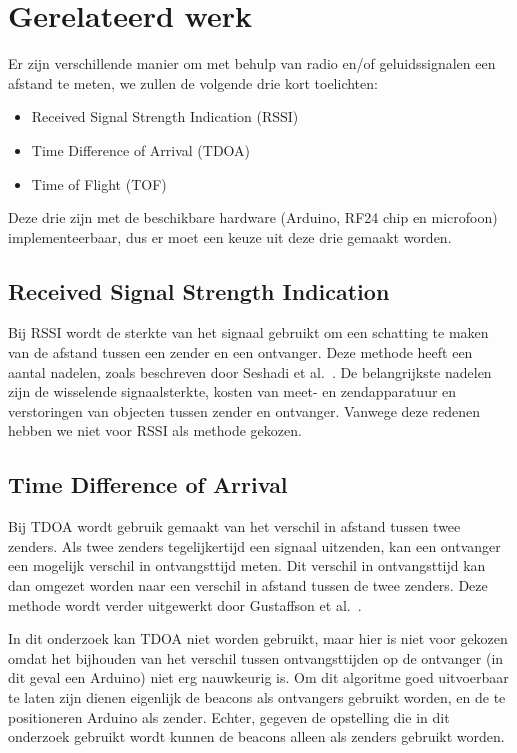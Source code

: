 \documentclass[a4paper,10pt]{article}
\begin{document}
\section{Gerelateerd werk}\label{sec:gerelateerd}
Er zijn verschillende manier om met behulp van radio en/of geluidssignalen een afstand te meten, we zullen de volgende drie kort toelichten:
\begin{itemize}
    \item Received Signal Strength Indication (RSSI)
    \item Time Difference of Arrival (TDOA)
    \item Time of Flight (TOF)
\end{itemize}
Deze drie zijn met de beschikbare hardware (Arduino, RF24 chip en microfoon) implementeerbaar, dus er moet een keuze uit deze drie gemaakt worden.

\subsection{Received Signal Strength Indication}
Bij RSSI wordt de sterkte van het signaal gebruikt om een schatting te maken van de afstand tussen een zender en een ontvanger. Deze methode heeft een aantal nadelen, zoals beschreven door Seshadi et al.~\cite{seshadri2005bayesian}. De belangrijkste nadelen zijn de wisselende signaalsterkte, kosten van meet- en zendapparatuur en verstoringen van objecten tussen zender en ontvanger. Vanwege deze redenen hebben we niet voor RSSI als methode gekozen.

\subsection{Time Difference of Arrival}
Bij TDOA wordt gebruik gemaakt van het verschil in afstand tussen twee zenders. Als twee zenders tegelijkertijd een signaal uitzenden, kan een ontvanger een mogelijk verschil in ontvangsttijd meten. Dit verschil in ontvangsttijd kan dan omgezet worden naar een verschil in afstand tussen de twee zenders. Deze methode wordt verder uitgewerkt door Gustaffson et al.~\cite{gustafsson2003positioning}.

In dit onderzoek kan TDOA niet worden gebruikt, maar hier is niet voor gekozen omdat het bijhouden van het verschil tussen ontvangsttijden op de ontvanger (in dit geval een Arduino) niet erg nauwkeurig is. Om dit algoritme goed uitvoerbaar te laten zijn dienen eigenlijk de beacons als ontvangers gebruikt worden, en de te positioneren Arduino als zender. Echter, gegeven de opstelling die in dit onderzoek gebruikt wordt kunnen de beacons alleen als zenders gebruikt worden.
\end{document}
